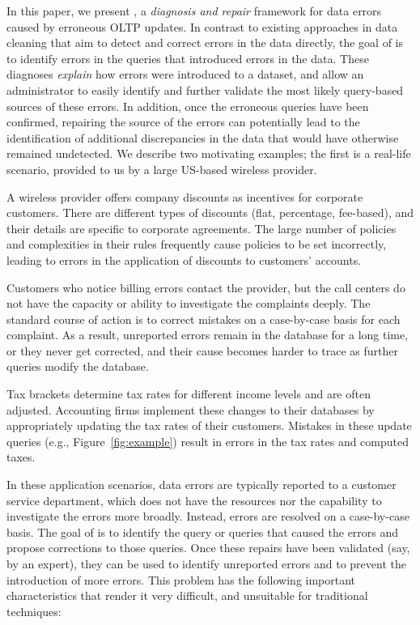 In this paper, we present \sys, a \emph{diagnosis and repair} framework for data errors
caused by erroneous OLTP updates. 
In contrast to existing approaches in data
cleaning that aim to detect and correct errors in the data directly, the goal
of \sys is to identify errors in the queries that introduced errors in the
data. These diagnoses \emph{explain} how errors were introduced to a
dataset, and allow an administrator to easily identify and further validate the most likely query-based sources of these errors. 
In addition, once the erroneous queries have been confirmed, repairing the source of the errors
can potentially lead to the identification of additional discrepancies in
the data that would have otherwise remained undetected.  
We describe two motivating examples; the first is a real-life scenario, provided to us by a large US-based wireless provider.
\begin{example}\label{ex:telco}

A wireless provider offers company discounts as incentives for
corporate customers. There are different types of discounts (flat, percentage,
fee-based), and their details are specific to corporate agreements. The large
number of policies and complexities in their rules frequently cause policies
to be set incorrectly, leading to errors in the application of discounts to
customers' accounts.

Customers who notice billing errors contact the provider, but the call centers
do not have the capacity or ability to investigate the complaints deeply. The
standard course of action is to correct mistakes on a case-by-case
basis for each complaint. As a result, unreported errors remain in the
database for a long time, or they never get corrected, and their cause becomes
harder to trace as further queries modify the database.

\end{example}
\begin{example}\label{ex:taxes}
    
Tax brackets determine tax rates for different income levels and are
often adjusted. Accounting firms implement these changes to their
databases by appropriately updating the tax rates of their customers. Mistakes
in these update queries (e.g., Figure~\ref{fig:example}) result in errors in
the tax rates and computed taxes. 

\end{example}
In these application scenarios, data errors are typically reported to
a customer service department, which does not have the resources nor
the capability to investigate the errors more broadly. Instead, errors
are resolved on a case-by-case basis. The goal of \sys is to identify
the query or queries that caused the errors and propose corrections to
those queries.  Once these repairs have been validated (say, by an expert), they can be used to identify unreported
errors and to prevent the introduction of more errors. This problem
has the following important characteristics that render it very difficult, and unsuitable for traditional
techniques:


